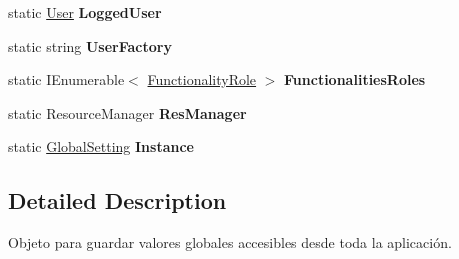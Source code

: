 \begin{DoxyCompactItemize}
\mbox{\label{class_h_k_supply_1_1_general_1_1_global_setting_adeb470418d2461437e6dc55fd41f78f5}} 
static \mbox{\hyperlink{class_h_k_supply_1_1_models_1_1_user}{User}} {\bfseries Logged\+User}
\item 
\mbox{\label{class_h_k_supply_1_1_general_1_1_global_setting_a557c22f63a711677ac3e4a1374260db3}} 
static string {\bfseries User\+Factory}
\item 
\mbox{\label{class_h_k_supply_1_1_general_1_1_global_setting_adf54b9c3d32b3dac949776dee6f17eb2}} 
static I\+Enumerable$<$ \mbox{\hyperlink{class_h_k_supply_1_1_models_1_1_functionality_role}{Functionality\+Role}} $>$ {\bfseries Functionalities\+Roles}
\item 
\mbox{\label{class_h_k_supply_1_1_general_1_1_global_setting_ad2628f5f55a5a8f640cd28aa425f968f}} 
static Resource\+Manager {\bfseries Res\+Manager}
\item 
\mbox{\label{class_h_k_supply_1_1_general_1_1_global_setting_afa2d235e79652e93864a33932863c1e2}} 
static \mbox{\hyperlink{class_h_k_supply_1_1_general_1_1_global_setting}{Global\+Setting}} {\bfseries Instance}
\end{DoxyCompactItemize}


\subsection{Detailed Description}
Objeto para guardar valores globales accesibles desde toda la aplicación. 

